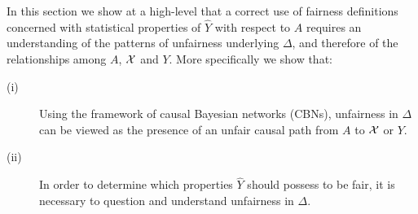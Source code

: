 \documentclass[runningheads]{llncs}
\newcommand{\CBNs}{CBNs}
\begin{document}
In this section we show at a high-level that a correct use of fairness definitions concerned with statistical properties of $\hat Y$ with respect to $A$ requires an understanding of the patterns of unfairness underlying $\Delta$, and therefore of the relationships among $A$, ${\cal X}$ and $Y$. More specifically we show that:
\vskip-0.5cm
\begin{description}
\item[(i)] Using the framework of causal Bayesian networks (\CBNs), unfairness in $\Delta$ can be viewed as the presence of an unfair causal path from $A$ to ${\cal X}$ or $Y$.\\[-8pt] 
\item[(ii)] In order to determine which properties $\hat Y$ should possess to be fair, it is necessary to question and understand unfairness in $\Delta$.
\end{description}
\end{document}
